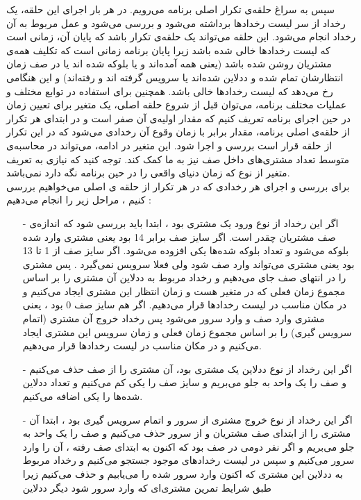 \documentclass[12pt]{article}
\begin{document}
\begin{itemize}
    سپس به سراغ حلقه‌ی‌ تکرار اصلی برنامه می‌رویم. در هر بار اجرای این حلقه، یک رخداد از سر لیست رخدادها برداشته می‌شود و بررسی می‌شود و عمل مربوط به آن رخداد انجام می‌شود. این حلقه می‌تواند یک حلقه‌ی تکرار باشد که پایان آن، زمانی است که لیست رخدادها خالی شده باشد زیرا پایان برنامه زمانی است که تکلیف همه‌ی مشتریان روشن شده باشد (یعنی همه آمده‌اند و یا بلوکه شده اند یا در صف زمان انتظارشان تمام شده و ددلاین شده‌اند یا سرویس گرفته اند و رفته‌اند) و این هنگامی رخ می‌دهد که لیست رخدادها خالی باشد. همچنین برای استفاده در توابع مختلف و عملیات مختلف برنامه، می‌توان قبل از شروع حلقه اصلی، یک متغیر  برای تعیین زمان در حین اجرای برنامه تعریف کنیم که مقدار اولیه‌ی آن صفر است و در ابتدای هر تکرار از حلقه‌ی اصلی برنامه، مقدار  برابر با زمان وقوع آن رخدادی می‌شود که در این تکرار از حلقه قرار است بررسی و اجرا شود. این متغیر در ادامه، می‌تواند در محاسبه‌ی متوسط تعداد مشتری‌های داخل صف نیز به ما کمک کند. توجه کنید که نیازی به تعریف
متغیر از نوع  که زمان دنیای واقعی را در حین برنامه نگه دارد نمی‌باشد.
    \\
    برای بررسی و اجرای هر رخدادی که در هر تکرار از حلقه ی اصلی می‌خواهیم بررسی کنیم ، مراحل زیر را انجام می‌دهیم :
    \begin{itemize}
        \item[-]
        اگر این رخداد از نوع ورود یک مشتری بود ، ابتدا باید بررسی شود که اندازه‌ی صف مشتریان چقدر است. اگر سایز صف
برابر 14 بود یعنی مشتری وارد شده بلوکه می‌شود و تعداد بلوکه شده‌ها یکی افزوده می‌شود. اگر سایز صف از 1 تا 13 
بود یعنی مشتری می‌تواند وارد صف شود ولی فعلا سرویس نمی‌گیرد . پس مشتری را در انتهای صف جای می‌دهیم و رخداد مربوط به ددلاین آن مشتری را بر اساس مجموع زمان فعلی که در متغیر  هست و زمان انتظار این مشتری
ایجاد می‌کنیم و در مکان مناسب در لیست رخدادها قرار می‌دهیم. اگر هم سایز صف 0 بود ، یعنی مشتری وارد صف و وارد سرور می‌شود پس رخداد خروج آن مشتری (اتمام سرویس گیری) را بر اساس مجموع زمان فعلی و زمان سرویس این مشتری ایجاد می‌کنیم و در مکان مناسب در لیست رخدادها قرار می‌دهیم.
        \item[-]
        اگر این رخداد از نوع ددلاین یک مشتری بود، آن مشتری را از صف حذف می‌کنیم و صف را یک واحد به جلو می‌بریم و سایز صف را یکی کم می‌کنیم و تعداد ددلاین شده‌ها را یکی اضافه می‌کنیم.
        \item[-]
        اگر این رخداد از نوع خروج مشتری از سرور و اتمام سرویس گیری بود ، ابتدا آن مشتری را از ابتدای صف مشتریان و از
سرور حذف می‌کنیم و صف را یک واحد به جلو می‌بریم و اگر نفر دومی در صف بود که اکنون به ابتدای صف رفته ، آن 
را وارد سرور می‌کنیم و سپس در لیست رخدادهای موجود جستجو می‌کنیم و رخداد مربوط به ددلاین این مشتری که اکنون وارد سرور شده را می‌یابیم و حذف می‌کنیم زیرا طبق شرایط تمرین مشتری‌ای که وارد سرور شود دیگر ددلاین

\end{itemize}
\end{itemize}
\end{document}
